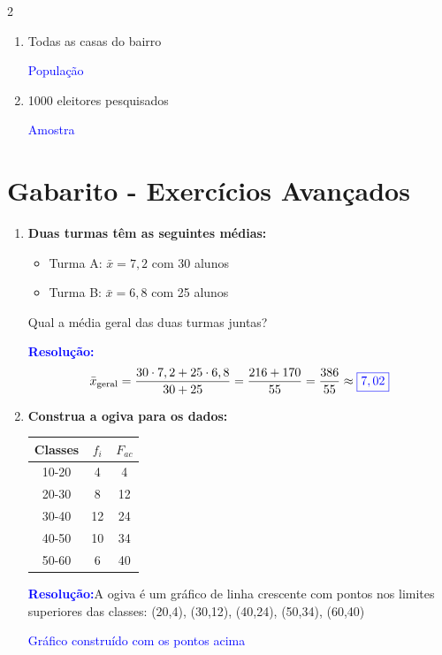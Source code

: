 \documentclass[11pt]{article}
\newcommand{\respostaNum}[1]{\textcolor{blue}{\boxed{#1}}}   %
\newcommand{\respostaTxt}[1]{\textcolor{blue}{#1}}           %
\newcommand{\resolucao}{\textbf{\textcolor{blue}{Resolução:}}}
\begin{document}
\begin{multicols}{2}
\begin{enumerate}[leftmargin=*]
\begin{enumerate}[label=\alph*)]
\respostaTxt{Amostra}

\item Todas as casas do bairro

\respostaTxt{População}

\item 1000 eleitores pesquisados

\respostaTxt{Amostra}
\end{enumerate}
\end{enumerate}

\section*{Gabarito - Exercícios Avançados}

\begin{enumerate}[leftmargin=*, start=11]

\item \textbf{Duas turmas têm as seguintes médias:}
\begin{itemize}
\item Turma A: $\bar{x} = 7,2$ com 30 alunos
\item Turma B: $\bar{x} = 6,8$ com 25 alunos
\end{itemize}
Qual a média geral das duas turmas juntas?

\resolucao
\[
\bar{x}_{\text{geral}} = \frac{30 \cdot 7,2 + 25 \cdot 6,8}{30 + 25} = \frac{216 + 170}{55} = \frac{386}{55} \approx \respostaNum{7,02}
\]

\item \textbf{Construa a ogiva para os dados:}

\begin{center}
\begin{tabular}{|c|c|c|}
\hline
\textbf{Classes} & \textbf{$f_i$} & \textbf{$F_{ac}$} \\
\hline
10-20 & 4 & 4 \\
20-30 & 8 & 12 \\
30-40 & 12 & 24 \\
40-50 & 10 & 34 \\
50-60 & 6 & 40 \\
\hline
\end{tabular}
\end{center}

\resolucao A ogiva é um gráfico de linha crescente com pontos nos limites superiores das classes: (20,4), (30,12), (40,24), (50,34), (60,40)

\respostaTxt{Gráfico construído com os pontos acima}


\end{enumerate}
\end{multicols}
\end{document}

